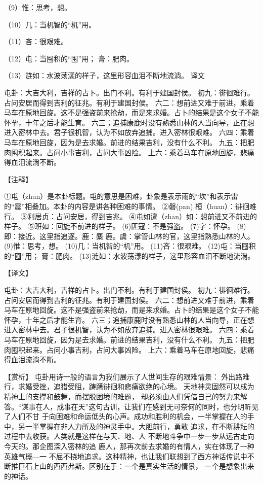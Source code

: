 \documentclass[12pt,UTF8]{ctexbook}
\begin{document}
（9）惟：思考，想。

（10）几：当机智的“机”用。

（11）吝：很艰难。

（12）屯：当囤积的“囤”用； 膏：肥肉。

（13）涟如：水波荡漾的样子，这里形容血泪不断地流淌。
译文

屯卦：大吉大利，吉祥的占卜。出门不利。有利于建国封侯。 初九：徘徊难行。占问安居而得到吉利的征兆。有利于建国封侯。 六二：想前进又难于前进，乘着马车在原地回旋。这不是强盗前来抢劫，而是来求婚。占卜的结果是这个女子不能怀孕，十年之后才能生育。 六三；追捕康鹿时没有熟悉山林的人当向导，正在想进入密林中去。君子很机智，认为不如放弃追捕。进入密林很艰难。 六四：乘着马车在原地回旋，因为是去求婚。前进的结果吉利，没有什么不利。 九五：把肥肉囤积起来。占问小事吉利，占问大事凶险。 上六：乘着马车在原地回旋，悲痛得血泪流淌不断。



【注释】

①屯（zhun）是本卦标题。屯的意思是困难，卦象是表示雨的“坎”和表示雷的“震”相叠加。本卦的内容是讲各种困难的事情。
②磐(pan) 桓（huan）：徘徊难行。
③利居贞：占问安居，得到吉兆。
④屯如邅（zhan）如：想前进又不前进的样子。
⑤班如：回旋不前进的样子。
(6)匪寇：不是强盗。
(7)字：怀孕。
(8)即：接近。这里指追逐。鹿：麋 鹿。虞：掌管山林的官，这里指熟悉山林的人。
(9)惟：思考，想。
(10)几：当机智的“机”用。
(11)吝：很艰难。
(12)屯：当囤积的“囤”用； 膏：肥肉。
(13)涟如：水波荡漾的样子，这里形容血泪不断地流淌。

【译文】

屯卦：大吉大利，吉祥的占卜。出门不利。有利于建国封侯。
初九：徘徊难行。占问安居而得到吉利的征兆。有利于建国封侯。
六二：想前进又难于前进，乘着马车在原地回旋。这不是强盗前来抢劫，而是来求婚。占卜的结果是这个女子不能怀孕，十年之后才能生育。
六三；追捕康鹿时没有熟悉山林的人当向导，正在想进入密林中去。君子很机智，认为不如放弃追捕。进入密林很艰难。
六四：乘着马车在原地回旋，因为是去求婚。前进的结果吉利，没有什么不利。
九五：把肥肉囤积起来。占问小事吉利，占问大事凶险。
上六：乘着马车在原地回旋，悲痛得血泪流淌不断。

【赏析】
屯卦用诗一般的语言为我们展示了人世间生存的艰难情景： 外出路难行，求婚受挫，追猎受阻，踌躇徘徊和悲痛欲绝的心境。 天地神灵固然可以成为精神上的支撑和鼓舞，而摆脱困境的难题， 却必须由人们凭借自己的努力来解答。“谋事在人，成事在天”这句古训，让我们在感到无可奈何的同时，也分明听见了人们不甘 于向困难和命运低头的心声。成功和胜利的机会，一半掌握在人的手中，另一半掌握在非人力所及的神灵手中。大胆前行，勇敢 追求，在不断耕耘的过程中去收获。人类就是这样在与天、地、人 不断地斗争中一步一步从远古走向今天的。那企图深入密林的追 鹿人，那再次前去求婚的有情人，实在体现了一种英雄气概—一 不屈不挠地追求。这种精神，也让我们联想到了西方神话传说中不断推巨石上山的西西弗斯。区别在于：一个是真实生活的情景， 一个是想象出来的神话。 
\end{document}
